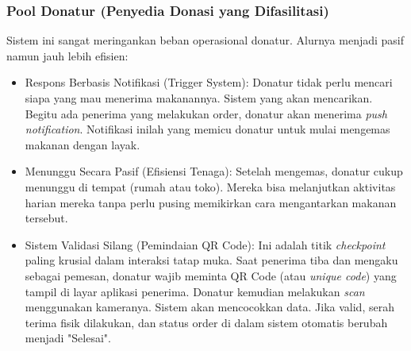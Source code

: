 \subsubsection{Pool Donatur (Penyedia Donasi yang Difasilitasi)}
Sistem ini sangat meringankan beban operasional donatur. Alurnya menjadi pasif namun jauh lebih efisien:
\begin{itemize}
    \item Respons Berbasis Notifikasi (Trigger System): Donatur tidak perlu mencari siapa yang mau menerima makanannya. Sistem yang akan mencarikan. Begitu ada penerima yang melakukan order, donatur akan menerima \textit{push notification}. Notifikasi inilah yang memicu donatur untuk mulai mengemas makanan dengan layak.
    \item Menunggu Secara Pasif (Efisiensi Tenaga): Setelah mengemas, donatur cukup menunggu di tempat (rumah atau toko). Mereka bisa melanjutkan aktivitas harian mereka tanpa perlu pusing memikirkan cara mengantarkan makanan tersebut.
    \item Sistem Validasi Silang (Pemindaian QR Code): Ini adalah titik \textit{checkpoint} paling krusial dalam interaksi tatap muka. Saat penerima tiba dan mengaku sebagai pemesan, donatur wajib meminta QR Code (atau \textit{unique code}) yang tampil di layar aplikasi penerima. Donatur kemudian melakukan \textit{scan} menggunakan kameranya. Sistem akan mencocokkan data. Jika valid, serah terima fisik dilakukan, dan status order di dalam sistem otomatis berubah menjadi "Selesai".
\end{itemize}

